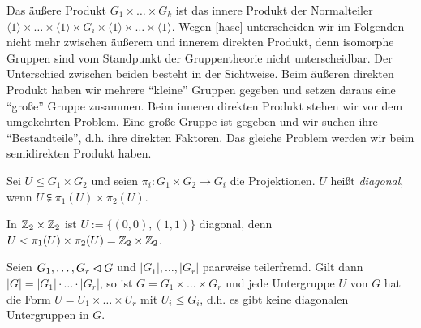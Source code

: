 \begin{bemerkung} \label{bratwurst}\label{1.12}
 Das \"au\ss{}ere Produkt $G_1\times \ldots \times G_k$ ist das innere Produkt der Normalteiler $\langle 1 \rangle\times \ldots \times \langle 1 \rangle\times G_i \times \langle 1 \rangle\times \ldots\times \langle 1 \rangle$. Wegen \ref{hase} unterscheiden wir im Folgenden nicht mehr zwischen \"au\ss{}erem und innerem direkten Produkt, denn isomorphe Gruppen sind vom Standpunkt der Gruppentheorie nicht unterscheidbar. Der Unterschied zwischen beiden besteht in der Sichtweise. Beim \"au\ss{}eren direkten Produkt haben wir mehrere ``kleine'' Gruppen gegeben und setzen daraus eine ``gro\ss{}e'' Gruppe zusammen. Beim inneren direkten Produkt stehen wir vor dem umgekehrten Problem. Eine gro\ss{}e Gruppe ist gegeben und wir suchen ihre ``Bestandteile'', d.h. ihre direkten Faktoren. Das gleiche Problem werden wir beim semidirekten Produkt haben.
\end{bemerkung}

\begin{definition}
 Sei $U\leq G_1\times G_2$ und seien $\pi_i:G_1\times G_2\to G_i$ die Projektionen. $U$ hei\ss{}t \emph{diagonal}, wenn $U\subsetneqq \pi_1(U)\times \pi_2(U)$.
\end{definition}

\begin{beispiel*}
 In $\mathbb{Z}_2\times\mathbb{Z}_2$ ist $U:=\lbrace (0,0), (1,1) \rbrace$ diagonal, denn $U < \pi_1(U)\times \pi_2(U)=\mathbb{Z}_2\times\mathbb{Z}_2$.
\end{beispiel*}

\begin{satz}\label{1.14}
 Seien $G_1,\ldots, G_r \lhd G$ und $|G_1|,\ldots, |G_r|$ paarweise teilerfremd. Gilt dann $|G|=|G_1|\cdot \ldots \cdot |G_r|$, so ist $G=G_1\times \ldots \times G_r$ und jede Untergruppe $U$ von $G$ hat die Form $U=U_1\times \ldots\times U_r$ mit $U_i\leq G_i$, d.h. es gibt keine diagonalen Untergruppen in $G$.
\end{satz}

